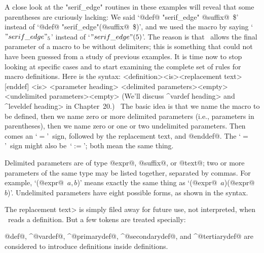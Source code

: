 {{{{\danger A close look at the "serif\_edge" routines in these examples
will reveal that some parentheses are curiously lacking: We said
`@def@ "serif\_edge" @suffix@~\$' instead of
`@def@ "serif\_edge"(@suffix@~\$)', and we used the macro by saying
`$"serif\_edge"_5$' instead of
`$"serif\_edge"(5)$'. The reason is that \MF\ allows the final parameter
of a macro to be without delimiters; this is something that could not
have been guessed from a study of previous examples. It is time now
to stop looking at specific cases and to start examining the complete
set of rules for macro definitions. Here is the syntax:
\beginsyntax
<definition><is><replacement text>[enddef]
<is>\is[=]
<parameter heading>
<delimited parameters>\is<empty>
 \is[expr]
 \alt[suffix]
<undelimited parameters>\is<empty>
\endsyntax
(We'll discuss ^\<vardef heading> and ^\<leveldef heading> in Chapter~20.)
\ The basic idea is that we name the macro to be defined, then we name
zero or more delimited parameters (i.e., parameters in parentheses),
then we name zero or one or two undelimited parameters.
Then comes an `$=$'~sign,
followed by the replacement text, and @enddef@. The `$=$'~sign might also
be~`$:=$'\thinspace; both mean the same thing.

\danger Delimited parameters are of type @expr@, @suffix@, or @text@;
two or more parameters of the same type may be listed together, separated
by commas. For example, `(@expr@~$a,b$)' means exactly the same thing as
`(@expr@~$a$)(@expr@~$b$)'. Undelimited parameters have eight possible
forms, as shown in the syntax.

\ninepoint %

\danger The \<replacement text> is simply filed away for future use,
not interpreted, when \MF\ reads a definition. But a few tokens are
treated specially:\enddanger\nobreak

\medskip
\item\bull @def@, ^@vardef@, ^@primarydef@, ^@secondarydef@, and
^@tertiarydef@ are considered to introduce definitions inside definitions.

}}}}
